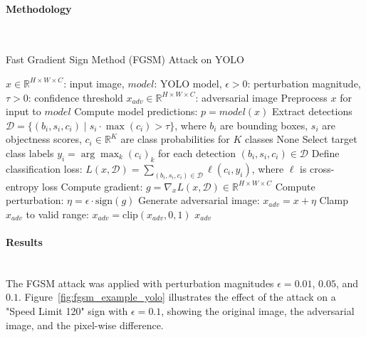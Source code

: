 \documentclass[../main.tex]{subfiles}
\begin{document}
\paragraph{Methodology}\leavevmode\\

\begin{breakablealgorithm}{Fast Gradient Sign Method (FGSM) Attack on YOLO}
\begin{algorithmic}[1]
\Require $x \in \mathbb{R}^{H \times W \times C}$: input image, $model$: YOLO model, $\epsilon > 0$: perturbation magnitude, $\tau > 0$: confidence threshold
\Ensure $x_{adv} \in \mathbb{R}^{H \times W \times C}$: adversarial image
\State Preprocess $x$ for input to $model$ 
\State Compute model predictions: $p = model(x)$ 
\State Extract detections $\mathcal{D} = \{ (b_i, s_i, c_i) \mid s_i \cdot \max(c_i) > \tau \}$, where $b_i$ are bounding boxes, $s_i$ are objectness scores, $c_i \in \mathbb{R}^K$ are class probabilities for $K$ classes
    \State \Return None 
\EndIf
\State Select target class labels $y_i = \arg\max_k (c_i)_k$ for each detection $(b_i, s_i, c_i) \in \mathcal{D}$
\State Define classification loss: $L(x, \mathcal{D}) = \sum_{(b_i, s_i, c_i) \in \mathcal{D}} \ell(c_i, y_i)$, where $\ell$ is cross-entropy loss
\State Compute gradient: $g = \nabla_x L(x, \mathcal{D}) \in \mathbb{R}^{H \times W \times C}$ 
\State Compute perturbation: $\eta = \epsilon \cdot \text{sign}(g)$ 
\State Generate adversarial image: $x_{adv} = x + \eta$
\State Clamp $x_{adv}$ to valid range: $x_{adv} = \text{clip}(x_{adv}, 0, 1)$ 
\State \Return $x_{adv}$
\end{algorithmic}
\end{breakablealgorithm}
\paragraph{Results}\leavevmode\\

The FGSM attack was applied with perturbation magnitudes $\epsilon=0.01$, $0.05$, and $0.1$. Figure~\ref{fig:fgsm_example_yolo} illustrates the effect of the attack on a "Speed Limit 120" sign with $\epsilon=0.1$, showing the original image, the adversarial image, and the pixel-wise difference.
\end{document}
